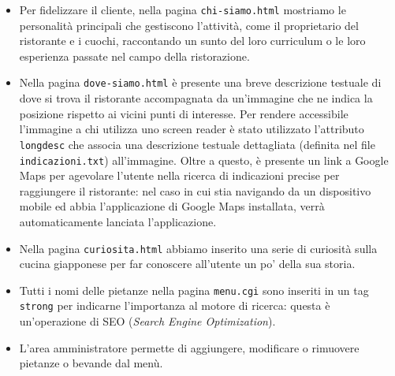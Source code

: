 \documentclass[../relazione.tex]{subfiles}
\begin{document}
\begin{itemize}
		\item Per fidelizzare il cliente, nella pagina \texttt{chi-siamo.html} mostriamo le personalità principali che gestiscono l'attività, come il proprietario del ristorante e i cuochi, raccontando un sunto del loro curriculum o le loro esperienza passate nel campo della ristorazione.
		\item Nella pagina \texttt{dove-siamo.html} è presente una breve descrizione testuale di dove si trova il ristorante accompagnata da un'immagine che ne indica la posizione rispetto ai vicini punti di interesse. Per rendere accessibile l'immagine a chi utilizza uno screen reader è stato utilizzato l'attributo \texttt{longdesc} che associa una descrizione testuale dettagliata (definita nel file \texttt{indicazioni.txt}) all'immagine. Oltre a questo, è presente un link a Google Maps per agevolare l'utente nella ricerca di indicazioni precise per raggiungere il ristorante: nel caso in cui stia navigando da un dispositivo mobile ed abbia l'applicazione di Google Maps installata, verrà automaticamente lanciata l'applicazione.
		\item Nella pagina \texttt{curiosita.html} abbiamo inserito una serie di curiosità sulla cucina giapponese per far conoscere all'utente un po' della sua storia.
		\item Tutti i nomi delle pietanze nella pagina \texttt{menu.cgi} sono inseriti in un tag \texttt{strong} per indicarne l'importanza al motore di ricerca: questa è un'operazione di SEO (\textit{Search Engine Optimization}).
		\item L'area amministratore permette di aggiungere, modificare o rimuovere pietanze o bevande dal menù.
	\end{itemize}
\end{document}

